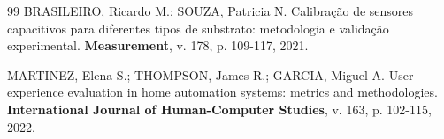 \documentclass[twoside,english,brazilian]{UNISINOSmonografia}
\begin{document}
\begin{thebibliography}{99}
BRASILEIRO, Ricardo M.; SOUZA, Patricia N. Calibração de sensores capacitivos para diferentes tipos de substrato: metodologia e validação experimental. \textbf{Measurement}, v. 178, p. 109-117, 2021.

MARTINEZ, Elena S.; THOMPSON, James R.; GARCIA, Miguel A. User experience evaluation in home automation systems: metrics and methodologies. \textbf{International Journal of Human-Computer Studies}, v. 163, p. 102-115, 2022.

\end{thebibliography}
\end{document}
